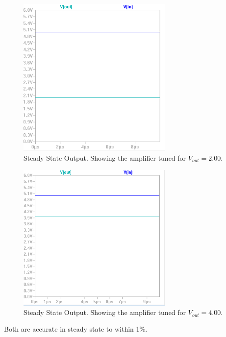 \documentclass[10pt]{amsart}
\begin{document}
\begin{figure}[h]
	\begin{center}
		\includegraphics[width=3in]{Media/ss1.png}
	\end{center}
	\caption{Steady State Output. Showing the amplifier tuned for $V_{out} = 2.00$.}
	\label{fig:pidfb}
\end{figure}

\begin{figure}[h]
	\begin{center}
		\includegraphics[width=3in]{Media/ss2.png}
	\end{center}
	\caption{Steady State Output. Showing the amplifier tuned for $V_{out} = 4.00$.}
	\label{fig:pidfb}
\end{figure}

Both are accurate in steady state to within 1\%.
\end{document}
